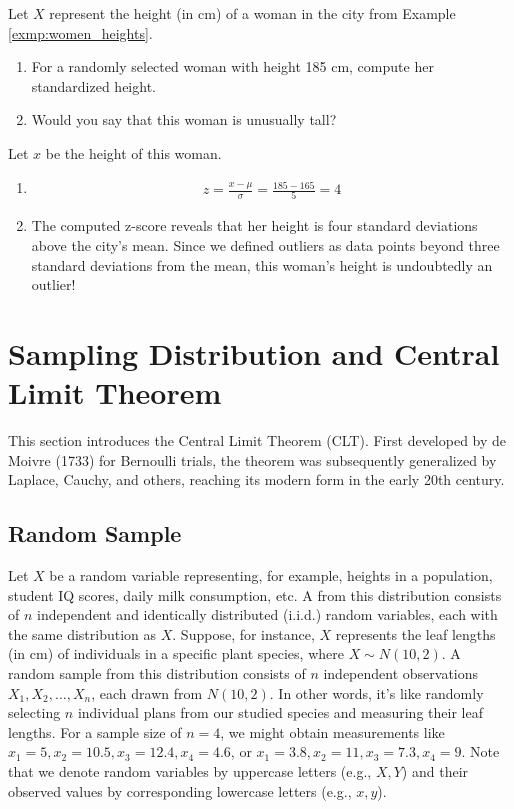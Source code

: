 \begin{exmp}
    Let \( X \) represent the height (in cm) of a woman in the city from Example \autoref{exmp:women_heights}.
    \begin{enumerate}
        \item For a randomly selected woman with height 185 cm, compute her standardized height.
        \item Would you say that this woman is unusually tall?
    \end{enumerate}
\end{exmp}
\begin{solution}
    Let \( x \) be the height of this woman.
    \begin{enumerate}
        \item \begin{gather*}
            z = \frac{x - \mu}{\sigma} = \frac{185 - 165}{5} = 4
        \end{gather*}
        \item The computed z-score reveals that her height is four standard deviations above the city's mean.
        Since we defined outliers as data points beyond three standard deviations from the mean,
        this woman's height is undoubtedly an outlier!
    \end{enumerate}
\end{solution}

\section{Sampling Distribution and Central Limit Theorem}\label{sec:clt}

This section introduces the Central Limit Theorem (CLT).
First developed by de Moivre (1733) for Bernoulli trials,
the theorem was subsequently generalized by Laplace, Cauchy, and others,
reaching its modern form in the early 20th century.

\subsection{Random Sample}

Let \( X \) be a random variable representing, for example, heights in a population, student IQ scores, daily milk consumption, etc.
A  from this distribution consists of \( n \) independent and identically distributed (i.i.d.) random variables, each with the same distribution as \( X \).
Suppose, for instance, \( X \) represents the leaf lengths (in cm) of individuals in a specific plant species, where \( X \sim N(10, 2) \).
A random sample from this distribution consists of \( n \) independent observations \( X_1, X_2, \ldots, X_n \), each drawn from \( N(10, 2) \).
In other words, it's like randomly selecting \( n \) individual plans from our studied species and measuring their leaf lengths.
For a sample size of \( n = 4 \), we might obtain measurements like \( x_1 = 5, x_2 = 10.5, x_3 = 12.4, x_4 = 4.6 \),
or \( x_1 = 3.8, x_2 = 11, x_3 = 7.3, x_4 = 9 \).
Note that we denote random variables by uppercase letters (e.g., \( X, Y \)) and their observed values by corresponding lowercase letters (e.g., \( x, y \)).

